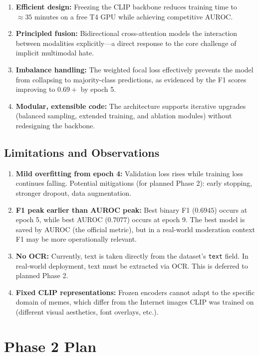 \documentclass[12pt,a4paper]{article}
\begin{document}
\begin{enumerate}
  \item \textbf{Efficient design:} Freezing the CLIP backbone reduces training time to $\approx 35$ minutes on a free T4 GPU while achieving competitive AUROC.
  \item \textbf{Principled fusion:} Bidirectional cross-attention models the interaction between modalities explicitly---a direct response to the core challenge of implicit multimodal hate.
  \item \textbf{Imbalance handling:} The weighted focal loss effectively prevents the model from collapsing to majority-class predictions, as evidenced by the F1 scores improving to $0.69+$ by epoch 5.
  \item \textbf{Modular, extensible code:} The architecture supports iterative upgrades (balanced sampling, extended training, and ablation modules) without redesigning the backbone.
\end{enumerate}

\subsection{Limitations and Observations}

\begin{enumerate}
  \item \textbf{Mild overfitting from epoch 4:} Validation loss rises while training loss continues falling. Potential mitigations (for planned Phase 2): early stopping, stronger dropout, data augmentation.
  \item \textbf{F1 peak earlier than AUROC peak:} Best binary F1 ($0.6945$) occurs at epoch 5, while best AUROC ($0.7077$) occurs at epoch 9. The best model is saved by AUROC (the official metric), but in a real-world moderation context F1 may be more operationally relevant.
  \item \textbf{No OCR:} Currently, text is taken directly from the dataset's \texttt{text} field. In real-world deployment, text must be extracted via OCR. This is deferred to planned Phase 2.
  \item \textbf{Fixed CLIP representations:} Frozen encoders cannot adapt to the specific domain of memes, which differ from the Internet images CLIP was trained on (different visual aesthetics, font overlays, etc.).
\end{enumerate}

\section{Phase 2 Plan}
\end{document}
